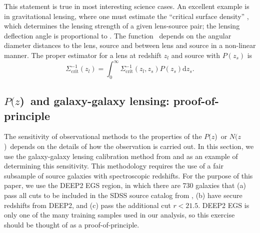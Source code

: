 \documentclass[12pt,preprint]{aastex}
\newcommand{\pofz}{$P(z$)}
\newcommand{\nofz}{$N(z$)}
\begin{document}
This statement is true in most interesting science cases.  An excellent example is in
gravitational lensing, where one must estimate the ``critical surface density''
\sigmacrit, which determines the lensing strength of a given lens-source pair; the
lensing deflection angle is proportional to \scinv.  The function
\sigmacrit\ depends on the angular diameter distances to the lens, source and
between lens and source in a non-linear manner.  The proper estimator for a lens
at redshift $z_{l}$ and source with $P(z_s)$ is
\begin{equation} \label{eq:calcscrit}
\Sigma^{-1}_{\mathrm{crit}}(z_l) = 
    \int_{0}^{\infty} \Sigma_{\mathrm{crit}}^{-1}(z_l, z_s) P(z_s) \mathrm{d}z_s.
\end{equation}


\subsection{\pofz\ and galaxy-galaxy lensing: proof-of-principle} \label{sec:pofp}

The sensitivity of observational methods to the properties of the
\pofz\ or \nofz\ depends on the details of how the observation is
carried out.  In
this section, we use the galaxy-galaxy lensing calibration method from
\cite{man08} and \citet{Nakajima11} as an example of determining this
sensitivity.  This methodology requires the use of a fair subsample of
source galaxies with spectroscopic redshifts.  For the purpose of this
paper, we use the DEEP2 EGS region, in which there are 730 galaxies
that (a) pass all cuts to be included in the SDSS source catalog from
\citet{MandelbaumSystematics05}, (b) have secure redshifts from DEEP2,
and (c) pass the additional cut $r<21.5$. 
DEEP2 EGS is only one of the many training samples used in our
analysis, 
so this exercise should be thought of as a proof-of-principle.
\end{document}
